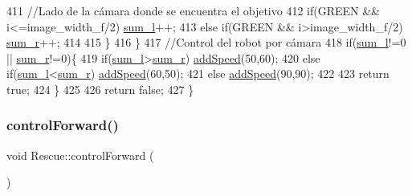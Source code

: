 \begin{DoxyCode}
411             \textcolor{comment}{//Lado de la cámara donde se encuentra el objetivo}
412             \textcolor{keywordflow}{if}(GREEN && i<=image\_width\_f/2) \hyperlink{classRescue_a92ae48ef6c0bb371cb0ea9c6eb4a8a87_a92ae48ef6c0bb371cb0ea9c6eb4a8a87}{sum\_l}++;
413             \textcolor{keywordflow}{else} \textcolor{keywordflow}{if}(GREEN && i>image\_width\_f/2) \hyperlink{classRescue_af84f4ef8ca1595be05ebcd5907f06c25_af84f4ef8ca1595be05ebcd5907f06c25}{sum\_r}++;
414             
415         \}
416       \}
417         \textcolor{comment}{//Control del robot por cámara}
418         \textcolor{keywordflow}{if}(\hyperlink{classRescue_a92ae48ef6c0bb371cb0ea9c6eb4a8a87_a92ae48ef6c0bb371cb0ea9c6eb4a8a87}{sum\_l}!=0 || \hyperlink{classRescue_af84f4ef8ca1595be05ebcd5907f06c25_af84f4ef8ca1595be05ebcd5907f06c25}{sum\_r}!=0)\{
419             \textcolor{keywordflow}{if}(\hyperlink{classRescue_a92ae48ef6c0bb371cb0ea9c6eb4a8a87_a92ae48ef6c0bb371cb0ea9c6eb4a8a87}{sum\_l}>\hyperlink{classRescue_af84f4ef8ca1595be05ebcd5907f06c25_af84f4ef8ca1595be05ebcd5907f06c25}{sum\_r}) \hyperlink{classRescue_a9a430924f65d71eca4e02dc9b2704947_a9a430924f65d71eca4e02dc9b2704947}{addSpeed}(50,60);
420             \textcolor{keywordflow}{else} \textcolor{keywordflow}{if}(\hyperlink{classRescue_a92ae48ef6c0bb371cb0ea9c6eb4a8a87_a92ae48ef6c0bb371cb0ea9c6eb4a8a87}{sum\_l}<\hyperlink{classRescue_af84f4ef8ca1595be05ebcd5907f06c25_af84f4ef8ca1595be05ebcd5907f06c25}{sum\_r}) \hyperlink{classRescue_a9a430924f65d71eca4e02dc9b2704947_a9a430924f65d71eca4e02dc9b2704947}{addSpeed}(60,50);
421             \textcolor{keywordflow}{else} \hyperlink{classRescue_a9a430924f65d71eca4e02dc9b2704947_a9a430924f65d71eca4e02dc9b2704947}{addSpeed}(90,90);
422             
423             \textcolor{keywordflow}{return} \textcolor{keyword}{true};
424         \}
425     
426       \textcolor{keywordflow}{return} \textcolor{keyword}{false};
427 \}
\end{DoxyCode}
\mbox{\label{classRescue_a47bd9c67c0e779f2dbf9ce6e5f81b831_a47bd9c67c0e779f2dbf9ce6e5f81b831}} 
\subsubsection{\texorpdfstring{control\+Forward()}{controlForward()}}
{\footnotesize\ttfamily void Rescue\+::control\+Forward (\begin{DoxyParamCaption}{ }\end{DoxyParamCaption})}



